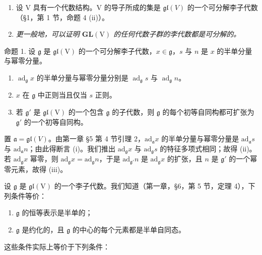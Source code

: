 \begin{enumerate}
\def\labelenumi{\arabic{enumi})}
\setcounter{enumi}{1}
\item
  设 V 具有一个代数结构。V 的导子所成的集是 \(\mathfrak{gl}(V)\) 的一个可分解李子代数（§1，第 1 节，命题 4 (ii)）。
\item
\emph{更一般地，可以证明 \(\mathbf{GL}(\mathrm{V})\) 的任何代数子群的李代数都是可分解的。}
\end{enumerate}

命题 1. 设 \(\mathfrak{g}\) 是 \(\mathfrak{gl}(\mathrm{V})\) 的一个可分解李子代数，\(x \in \mathfrak{g}\)，\(s\) 与 \(n\) 是 \(x\) 的半单分量与幂零分量。

\begin{enumerate}
\def\labelenumi{(\roman{enumi})}
\item
  \(\operatorname{ad}_{\mathfrak{g}}x\) 的半单分量与幂零分量分别是 \(\operatorname{ad}_{\mathfrak{g}}s\) 与 \(\operatorname{ad}_{\mathfrak{g}}n\)。
\item
  \(x\) 在 \(\mathfrak{g}\) 中正则当且仅当 \(s\) 正则。
\item
  若 \(\mathfrak{g}'\) 是 \(\mathfrak{gl}(\mathrm{V})\) 的一个包含 \(\mathfrak{g}\) 的子代数，则 \(\mathfrak{g}\) 的每个初等自同构都可扩张为 \(\mathfrak{g}'\) 的一个初等自同构。
\end{enumerate}

置 \(\mathfrak{a} = \mathfrak{gl}(V)\)。由第一章 §5 第 4 节引理 2，\(\mathrm{ad}_{\mathfrak{a}}x\) 的半单分量与幂零分量是 \(\mathrm{ad}_{\mathfrak{a}}s\) 与 \(\mathrm{ad}_{\mathfrak{a}}n\)；由此得断言 (i)。我们推出 \(\mathrm{ad}_{\mathfrak{g}}x\) 与 \(\mathrm{ad}_{\mathfrak{g}}s\) 的特征多项式相同；故得 (ii)。若 \(\mathrm{ad}_{\mathfrak{g}}x\) 幂零，则 \(\mathrm{ad}_{\mathfrak{g}}x = \mathrm{ad}_{\mathfrak{g}}n\)，于是 \(\mathrm{ad}_{\mathfrak{g}'}n\) 是 \(\mathrm{ad}_{\mathfrak{g}}x\) 的扩张，且 \(n\) 是 \(\mathfrak{g}'\) 的一个幂零元素，故得 (iii)。

设 \(\mathfrak{g}\) 是 \(\mathfrak{gl}(\mathrm{V})\) 的一个李子代数。我们知道（第一章，§6，第 5 节，定理 4），下列条件等价：

\begin{enumerate}
\def\labelenumi{(\roman{enumi})}
\item
  \(\mathfrak{g}\) 的恒等表示是半单的；
\item
  \(\mathfrak{g}\) 是约化的，且 \(\mathfrak{g}\) 的中心的每个元素都是半单自同态。
\end{enumerate}

这些条件实际上等价于下列条件：

